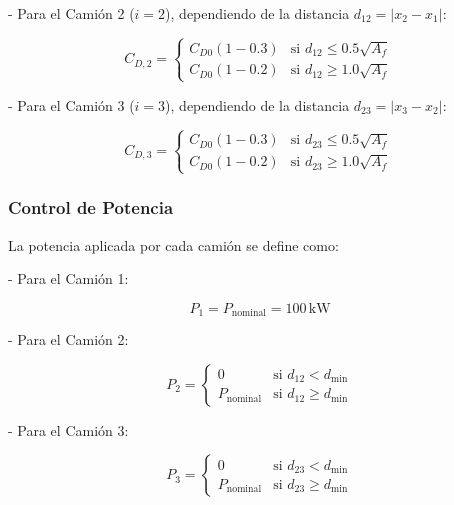 \documentclass[11pt,stdletter,orderfromtodate,sigleft,twoside]{report}
\begin{document}
- Para el Camión 2 ($i=2$), dependiendo de la distancia $d_{12} = |x_2 - x_1|$:

\begin{equation}
C_{D,2} =
\begin{cases} 
C_{D0} (1 - 0.3) & \text{si } d_{12} \leq 0.5 \sqrt{A_f} \\
C_{D0} (1 - 0.2) & \text{si } d_{12} \geq 1.0 \sqrt{A_f}
\end{cases}
\end{equation}

- Para el Camión 3 ($i=3$), dependiendo de la distancia $d_{23} = |x_3 - x_2|$:

\begin{equation}
C_{D,3} =
\begin{cases} 
C_{D0} (1 - 0.3) & \text{si } d_{23} \leq 0.5 \sqrt{A_f} \\
C_{D0} (1 - 0.2) & \text{si } d_{23} \geq 1.0 \sqrt{A_f} 
\end{cases}
\end{equation}

\subsubsection{Control de Potencia}

La potencia aplicada por cada camión se define como:

- Para el Camión 1:

\begin{equation}
P_1 = P_{\text{nominal}} = 100 \, \text{kW}
\end{equation}

- Para el Camión 2:

\begin{equation}
P_2 =
\begin{cases} 
0 & \text{si } d_{12} < d_{\text{min}} \\
P_{\text{nominal}} & \text{si } d_{12} \geq d_{\text{min}}
\end{cases}
\end{equation}

- Para el Camión 3:

\begin{equation}
P_3 =
\begin{cases} 
0 & \text{si } d_{23} < d_{\text{min}} \\
P_{\text{nominal}} & \text{si } d_{23} \geq d_{\text{min}}
\end{cases}
\end{equation}
\end{document}
